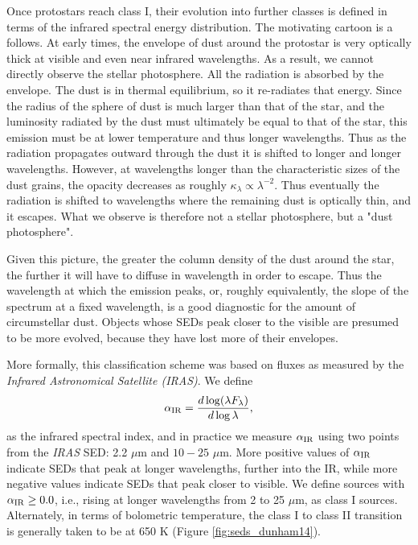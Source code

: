 Once protostars reach class I, their evolution into further classes is defined in terms of the infrared spectral energy distribution. The motivating cartoon is a follows. At early times, the envelope of dust around the protostar is very optically thick at visible and even near infrared wavelengths. As a result, we cannot directly observe the stellar photosphere. All the radiation is absorbed by the envelope. The dust is in thermal equilibrium, so it re-radiates that energy. Since the radius of the sphere of dust is much larger than that of the star, and the luminosity radiated by the dust must ultimately be equal to that of the star, this emission must be at lower temperature and thus longer wavelengths. Thus as the radiation propagates outward through the dust it is shifted to longer and longer wavelengths. However, at wavelengths longer than the characteristic sizes of the dust grains, the opacity decreases as roughly $\kappa_\lambda \propto \lambda^{-2}$. Thus eventually the radiation is shifted to wavelengths where the remaining dust is optically thin, and it escapes. What we observe is therefore not a stellar photosphere, but a "dust photosphere".

Given this picture, the greater the column density of the dust around the star, the further it will have to diffuse in wavelength in order to escape. Thus the wavelength at which the emission peaks, or, roughly equivalently, the slope of the spectrum at a fixed wavelength, is a good diagnostic for the amount of circumstellar dust. Objects whose SEDs peak closer to the visible are presumed to be more evolved, because they have lost more of their envelopes.

More formally, this classification scheme was based on fluxes as measured by the \textit{Infrared Astronomical Satellite (IRAS)}. We define
\begin{equation}
\alpha_{\rm IR} = \frac{d\log (\lambda F_{\lambda})}{d\log\lambda},
\end{equation}
as the infrared spectral index, and in practice we measure $\alpha_{\rm IR}$ using two points from the \textit{IRAS} SED: 2.2 $\mu$m and $10-25$ $\mu$m. More positive values of $\alpha_{\rm IR}$ indicate SEDs that peak at longer wavelengths, further into the IR, while more negative values indicate SEDs that peak closer to visible. We define sources with $\alpha_{\rm IR}\geq 0.0$, i.e., rising at longer wavelengths from 2 to 25 $\mu$m, as class I sources. Alternately, in terms of bolometric temperature, the class I to class II transition is generally taken to be at 650 K (Figure \ref{fig:seds_dunham14}).

